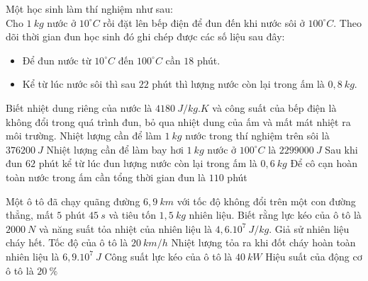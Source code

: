 \begin{ex}
	Một học sinh làm thí nghiệm như sau:\\
	Cho $1\ kg$ nước ở $10^\circ C$ rồi đặt lên bếp điện để đun đến khi nước sôi ở $100^\circ C$. Theo dõi thời gian đun học sinh đó ghi chép được các số liệu sau đây:
	\begin{itemize}
	\item Để đun nước từ $10^\circ C$ đến $100^\circ C$ cần $18$ phút.
	\item Kể từ lúc nước sôi thì sau $22$ phút thì lượng nước còn lại trong ấm là $0,8\ kg$.
	\end{itemize}
	 Biết nhiệt dung riêng của nước là $4180\ J/kg.K$ và công suất của bếp điện là không đổi trong quá trình đun, bỏ qua nhiệt dung của ấm và mất mát nhiệt ra môi trường.
	\choiceTFt
	{\True Nhiệt lượng cần để làm $1\ kg$ nước trong thí nghiệm trên sôi là $376200\ J$}
	{\True Nhiệt lượng cần để làm bay hơi $1\ kg$ nước ở $100^\circ C$ là $2299000\ J$}
	{\True Sau khi đun $62$ phút kể từ lúc đun lượng nước còn lại trong ấm là $0,6\ kg$}
	{Để cô cạn hoàn toàn nước trong ấm cần tổng thời gian đun là $110$ phút}
\end{ex}

\begin{ex}
	Một ô tô đã chạy quãng đường $6,9\ km$ với tốc độ không đổi trên một con đường thẳng, mất $5$ phút $45\ s$ và tiêu tốn $1,5\ kg$ nhiên liệu. Biết rằng lực kéo của ô tô là $2000\ N$ và năng suất tỏa nhiệt của nhiên liệu là $4,6.10^7\ J/kg$. Giả sử nhiên liệu cháy hết.
	\choiceTFt
	{Tốc độ của ô tô là $20\ km/h$}
	{\True Nhiệt lượng tỏa ra khi đốt cháy hoàn toàn nhiên liệu là $6,9.10^7\ J$}
	{\True Công suất lực kéo của ô tô là $40\ kW$}
	{\True Hiệu suất của động cơ ô tô là $20\ \%$}
\end{ex}
